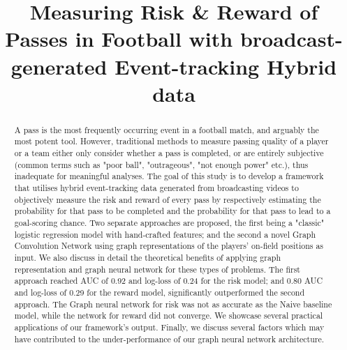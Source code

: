 \documentclass[conference]{IEEEtran}
\begin{document}
\title{Measuring Risk \& Reward of Passes in Football with broadcast-generated Event-tracking Hybrid data}

\author{
}

\maketitle







\begin{abstract}
A pass is the most frequently occurring event in a football match, and arguably the most potent tool. However, traditional methods to measure passing quality of a player or a team either only consider whether a pass is completed, or are entirely subjective (common terms such as "poor ball", "outrageous", "not enough power" etc.), thus inadequate for meaningful analyses. The goal of this study is to develop a framework that utilises hybrid event-tracking data generated from broadcasting videos to objectively measure the risk and reward of every pass by respectively estimating the probability for that pass to be completed and the probability for that pass to lead to a goal-scoring chance. Two separate approaches are proposed, the first being a "classic" logistic regression model with hand-crafted features; and the second a novel Graph Convolution Network using graph representations of the players' on-field positions as input. We also discuss in detail the theoretical benefits of applying graph representation and graph neural network for these types of problems. The first approach reached AUC of 0.92 and log-loss of 0.24 for the risk model; and 0.80 AUC and log-loss of 0.29 for the reward model, significantly outperformed the second approach. The Graph neural network for risk was not as accurate as the Naive baseline model, while the network for reward did not converge. We showcase several practical applications of our framework's output. Finally, we discuss several factors which may have contributed to the under-performance of our graph neural network architecture.
\end{abstract}
\end{document}
